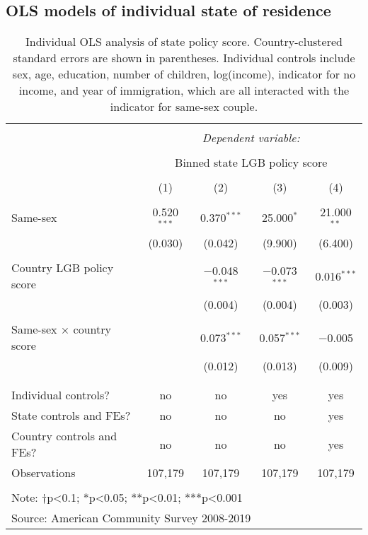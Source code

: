 \documentclass[
  11pt,
]{article}
\begin{document}
\newpage

\hypertarget{ols-models-of-individual-state-of-residence}{%
\subsection{OLS models of individual state of residence}\label{ols-models-of-individual-state-of-residence}}

\begin{table}[!htbp] \centering 
  \caption{Individual OLS analysis of state policy score. Country-clustered standard errors are shown in parentheses. Individual controls include sex, age, education, number of children, log(income), indicator for no income, and year of immigration, which are all interacted with the indicator for same-sex couple.} 
  \label{tab:ols} 
\begin{tabular}{@{\extracolsep{5pt}}lcccc} 
\\[-1.8ex]\hline 
\hline \\[-1.8ex] 
 & \multicolumn{4}{c}{\textit{Dependent variable:}} \\ 
\cline{2-5} 
\\[-1.8ex] & \multicolumn{4}{c}{Binned state LGB policy score} \\ 
\\[-1.8ex] & (1) & (2) & (3) & (4)\\ 
\hline \\[-1.8ex] 
 Same-sex & 0.520$^{***}$ & 0.370$^{***}$ & 25.000$^{*}$ & 21.000$^{**}$ \\ 
  & (0.030) & (0.042) & (9.900) & (6.400) \\ 
  & & & & \\ 
 Country LGB policy score &  & $-$0.048$^{***}$ & $-$0.073$^{***}$ & 0.016$^{***}$ \\ 
  &  & (0.004) & (0.004) & (0.003) \\ 
  & & & & \\ 
 Same-sex × country score &  & 0.073$^{***}$ & 0.057$^{***}$ & $-$0.005 \\ 
  &  & (0.012) & (0.013) & (0.009) \\ 
  & & & & \\ 
\hline \\[-1.8ex] 
Individual controls? & no & no & yes & yes \\ 
State controls and FEs? & no & no & no & yes \\ 
Country controls and FEs? & no & no & no & yes \\ 
Observations & 107,179 & 107,179 & 107,179 & 107,179 \\ 
\hline 
\hline \\[-1.8ex] 
\multicolumn{5}{l}{Note: †p<0.1; *p<0.05; **p<0.01; ***p<0.001} \\ 
\multicolumn{5}{l}{Source: American Community Survey 2008-2019} \\ 
\end{tabular} 
\end{table}
\end{document}
